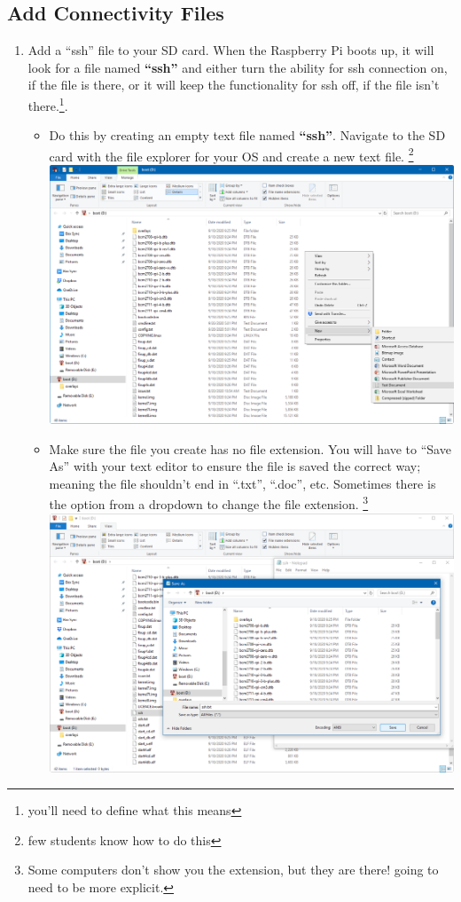 \documentclass{article}
\begin{document}
\subsection{Add Connectivity Files} \label{networkssh}

\begin{enumerate}
  \item Add a ``ssh'' file to your SD card. When the Raspberry Pi boots up, it will look for a file named \textbf{``ssh''} and either turn the ability for ssh connection on, if the file is there, or it will keep the functionality for ssh off, if the file isn't there.\footnote{you'll need to define what this means}. 
  \begin{itemize}
  \item Do this by creating an empty text file named \textbf{``ssh''}. Navigate to the SD card with the file explorer for your OS and create a new text file. \footnote{few students know how to do this}
  \newline
  \newline
  \includegraphics[width=1.00\textwidth]{sdbootnew}
  \item Make sure the file you create has no file extension. You will have to ``Save As'' with your text editor to ensure the file is saved the correct way; meaning the file shouldn't end in ``.txt'', ``.doc'', etc. Sometimes there is the option from a dropdown to change the file extension. \footnote{Some computers don't show you the extension, but they are there! going to need to be more explicit.}
  \newline
  \newline
  \includegraphics[width=1.00\textwidth]{sdbootaf}

\end{itemize}
\end{enumerate}
\end{document}
